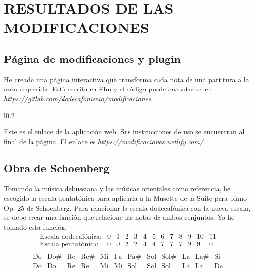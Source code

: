 	\chapter{RESULTADOS DE LAS MODIFICACIONES}
    
    \section{Página de modificaciones y plugin}
   
    He creado una página interactiva que transforma cada nota de una partitura a la nota requerida. Está escrita en Elm y el código puede encontrarse en \textit{https://gitlab.com/dodecafonismo/modificaciones}.
   
    \begin{wrapfigure}{l}{0.2\textwidth}
    	\vspace{-0.5cm}
    	\vspace{-1.5cm}
    \end{wrapfigure} Este es el enlace de la aplicación web. Sus instrucciones de uso se encuentran al final de la página. El enlace es \textit{https://modificaciones.netlify.com/}.
    
    \section{Obra de Schoenberg}
   
   	Tomando la música debussiana y las músicas orientales como referencia, he escogido la escala pentatónica para aplicarla a la Musette de la Suite para piano Op. 25 de Schoenberg. Para relacionar la escala dodecafónica con la nueva escala, se debe crear una función que relacione las notas de ambos conjuntos. Yo he tomado esta función:
   	$$\left.\begin{matrix}\text{Escala dodecafónica:}&0&1&2&3&4&5&6&7&8&9&10&11\\\text{Escala pentatónica:}&0&0&2&2&4&4&7&7&7&9&9&0\\\end{matrix}\right.$$
   	$$\left.\begin{matrix}\text{Do}&\text{Do\#}&\text{Re}&\text{Re\#}&\text{Mi}&\text{Fa}&\text{Fa\#}&\text{Sol}&\text{Sol\#}&\text{La}&\text{La\#}&\text{Si}\\\text{Do}&\text{Do}&\text{Re}&\text{Re}&\text{Mi}&\text{Mi}&\text{Sol}&\text{Sol}&\text{Sol}&\text{La}&\text{La}&\text{Do}\\\end{matrix}\right.$$
   	
